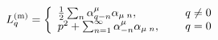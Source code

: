 \begin{equation}
L_q^{({\rm m})} = \left\{
\begin{array}{ll}
\frac{1}{2}\sum_{n}\alpha^\mu_{q-n} \alpha_{\mu \; n}, & q \neq 0\\
p^2 + \sum_{n = 1}^{ \infty}  \alpha^\mu_{-n} \alpha_{\mu
\; n}, \;\;\;\;\;& q = 0
\end{array}
\right.
\end{equation}

